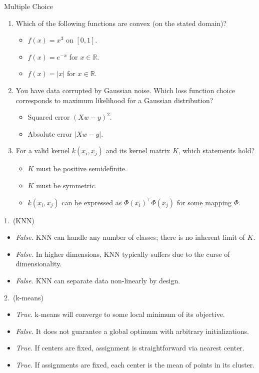 \documentclass{article}
\begin{document}
\begin{exercise}{Multiple Choice}
\begin{enumerate}
    \item Which of the following functions are convex (on the stated domain)?
      \begin{itemize}
        \item $f(x) = x^3$ on $[0,1]$.
        \item $f(x) = e^{-x}$ for $x \in \mathbb{R}$.
        \item $f(x) = |x|$ for $x \in \mathbb{R}$.
      \end{itemize}

    \item You have data corrupted by Gaussian noise. Which loss function choice corresponds to maximum likelihood for a Gaussian distribution?
      \begin{itemize}
        \item Squared error $(Xw - y)^2$.
        \item Absolute error $|Xw - y|$.
      \end{itemize}

    \item For a valid kernel $k(x_i, x_j)$ and its kernel matrix $K$, which statements hold?
      \begin{itemize}
        \item $K$ must be positive semidefinite.
        \item $K$ must be symmetric.
        \item $k(x_i, x_j)$ can be expressed as $\Phi(x_i)^\top \Phi(x_j)$ for some mapping $\Phi$.
      \end{itemize}
  \end{enumerate}

  \begin{solution}
    1.\ (KNN)
    \begin{itemize}
      \item \emph{False.} KNN can handle any number of classes; there is no inherent limit of $K$.
      \item \emph{False.} In higher dimensions, KNN typically suffers due to the curse of dimensionality.
      \item \emph{False.} KNN can separate data non-linearly by design.
    \end{itemize}

    2.\ (k-means)
    \begin{itemize}
      \item \emph{True.} k-means will converge to some local minimum of its objective.
      \item \emph{False.} It does not guarantee a global optimum with arbitrary initializations.
      \item \emph{True.} If centers are fixed, assignment is straightforward via nearest center.
      \item \emph{True.} If assignments are fixed, each center is the mean of points in its cluster.
    \end{itemize}


\end{solution}
\end{exercise}
\end{document}
